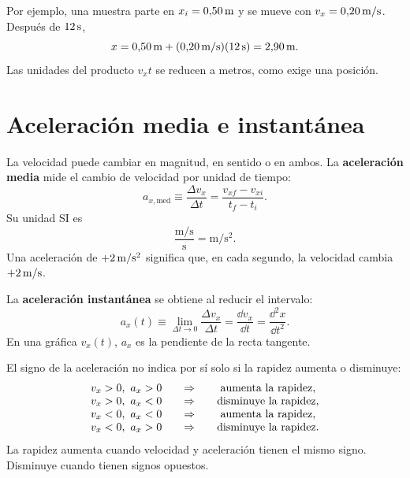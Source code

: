 \documentclass[11pt]{article}
\begin{document}
Por ejemplo, una muestra parte en \(x_i=0{,}50\,\mathrm{m}\) y se mueve con
\(v_x=0{,}20\,\mathrm{m/s}\). Después de \(12\,\mathrm{s}\),
\[
  x
  =
  0{,}50\,\mathrm{m}
  +(0{,}20\,\mathrm{m/s})(12\,\mathrm{s})
  =
  2{,}90\,\mathrm{m}.
\]
Las unidades del producto \(v_xt\) se reducen a metros, como exige una
posición.

\section{Aceleración media e instantánea}

La velocidad puede cambiar en magnitud, en sentido o en ambos. La
\textbf{aceleración media} mide el cambio de velocidad por unidad de tiempo:
\[
  a_{x,\mathrm{med}}
  \equiv
  \frac{\Delta v_x}{\Delta t}
  =
  \frac{v_{xf}-v_{xi}}{t_f-t_i}.
\]
Su unidad SI es
\[
  \frac{\mathrm{m/s}}{\mathrm{s}}
  =
  \mathrm{m/s^2}.
\]
Una aceleración de \(+2\,\mathrm{m/s^2}\) significa que, en cada segundo, la
velocidad cambia \(+2\,\mathrm{m/s}\).

La \textbf{aceleración instantánea} se obtiene al reducir el intervalo:
\[
  a_x(t)
  \equiv
  \lim_{\Delta t\to0}
  \frac{\Delta v_x}{\Delta t}
  =
  \frac{\dd v_x}{\dd t}
  =
  \frac{\dd^2x}{\dd t^2}.
\]
En una gráfica \(v_x(t)\), \(a_x\) es la pendiente de la recta tangente.

\begin{center}
\end{center}

El signo de la aceleración no indica por sí solo si la rapidez aumenta o
disminuye:
\[
\begin{array}{c@{\qquad}c@{\qquad}c}
v_x>0,\ a_x>0 &\Rightarrow& \text{aumenta la rapidez},\\
v_x>0,\ a_x<0 &\Rightarrow& \text{disminuye la rapidez},\\
v_x<0,\ a_x<0 &\Rightarrow& \text{aumenta la rapidez},\\
v_x<0,\ a_x>0 &\Rightarrow& \text{disminuye la rapidez}.
\end{array}
\]
La rapidez aumenta cuando velocidad y aceleración tienen el mismo signo.
Disminuye cuando tienen signos opuestos.
\end{document}
